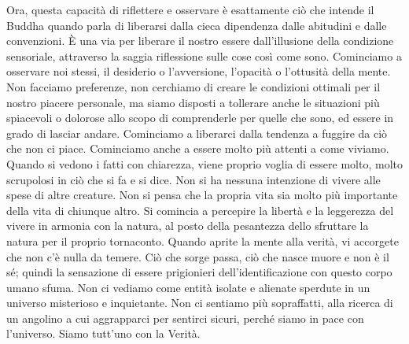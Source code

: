 Ora, questa capacità di riflettere e osservare è esattamente ciò che
intende il Buddha quando parla di liberarsi dalla cieca dipendenza dalle
abitudini e dalle convenzioni. È una via per liberare il nostro essere
dall'illusione della condizione sensoriale, attraverso la saggia
riflessione sulle cose così come sono. Cominciamo a osservare noi
stessi, il desiderio o l'avversione, l'opacità o l'ottusità della mente.
Non facciamo preferenze, non cerchiamo di creare le condizioni ottimali
per il nostro piacere personale, ma siamo disposti a tollerare anche le
situazioni più spiacevoli o dolorose allo scopo di comprenderle per
quelle che sono, ed essere in grado di lasciar andare. Cominciamo a
liberarci dalla tendenza a fuggire da ciò che non ci piace. Cominciamo
anche a essere molto più attenti a come viviamo. Quando si vedono i
fatti con chiarezza, viene proprio voglia di essere molto, molto
scrupolosi in ciò che si fa e si dice. Non si ha nessuna intenzione di
vivere alle spese di altre creature. Non si pensa che la propria vita
sia molto più importante della vita di chiunque altro. Si comincia a
percepire la libertà e la leggerezza del vivere in armonia con la
natura, al posto della pesantezza dello sfruttare la natura per il
proprio tornaconto. Quando aprite la mente alla verità, vi accorgete che
non c'è nulla da temere. Ciò che sorge passa, ciò che nasce muore e non
è il sé; quindi la sensazione di essere prigionieri dell'identificazione
con questo corpo umano sfuma. Non ci vediamo come entità isolate e
alienate sperdute in un universo misterioso e inquietante. Non ci
sentiamo più sopraffatti, alla ricerca di un angolino a cui aggrapparci
per sentirci sicuri, perché siamo in pace con l'universo. Siamo tutt'uno
con la Verità.

